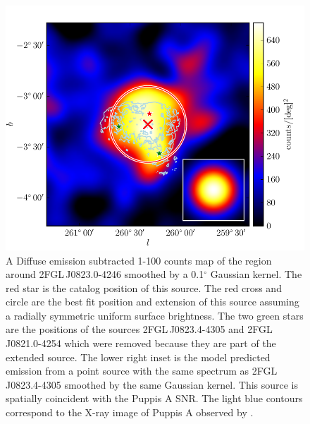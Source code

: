 \documentclass[12pt,preprint]{aastex}
\newcommand{\gev}{\text{GeV}\xspace}
\newcommand{\rosat}{\text{{\em ROSAT}}\xspace}
\renewcommand{\deg}{\ensuremath{^\circ}\xspace}
\begin{document}
\begin{figure}
  \begin{center}
    \includegraphics[type=pdf,ext=.pdf,read=.pdf]{source_plots/source_1FGL_J0823.3-4248}
  \end{center}
  \caption{A Diffuse emission subtracted 1-100
  \gev counts map of the region around 2FGL\,J0823.0-4246 smoothed
  by a 0.1\deg Gaussian kernel.  The red star is the catalog position
  of this source.  The red cross and circle are the best fit position
  and extension of this source assuming a radially symmetric uniform
  surface brightness.  The two green stars are the positions of the
  sources 2FGL\,J0823.4-4305 and 2FGL\,J0821.0-4254 which were removed
  because they are part of the extended source.  The lower right inset
  is the model predicted emission from a point source with the same
  spectrum as 2FGL\,J0823.4-4305 smoothed by the same Gaussian kernel.
  This source is spatially coincident with the Puppis A SNR. The
  light blue contours correspond to the X-ray image of Puppis A observed by 
  \rosat
  \citep{rosat_puppis_a}. 
  }\label{1FGL_J0823.3-4248}
\end{figure}
\end{document}
